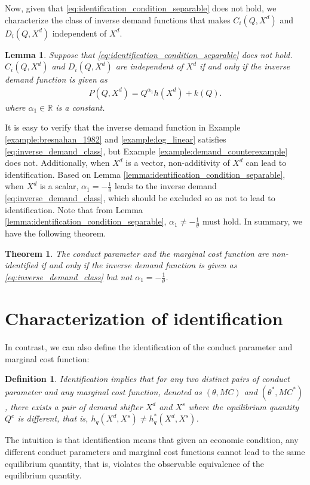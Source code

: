 \documentclass[11pt, a4paper]{article}
\newtheorem{theorem}{Theorem}
\newtheorem{lemma}{Lemma}
\newtheorem{definition}{Definition}
\theoremstyle{remark}
\begin{document}
Now, given that \eqref{eq:identification_condition_separable} does not hold, we characterize the class of inverse demand functions that makes $C_i(Q, X^{d})$ and $D_i(Q, X^{d})$ independent of $X^{d}$.
\begin{lemma}\label{lemma:non-identification_inverse_demand}
    Suppose that \eqref{eq:identification_condition_separable} does not hold.
    $C_i(Q, X^{d})$ and $D_i(Q, X^{d})$ are independent of $X^{d}$ if and only if the inverse demand function is given as
    \begin{align}
        P(Q, X^{d}) = Q^{\alpha_1}h(X^{d}) + k(Q). \label{eq:inverse_demand_class}
    \end{align}
    where $\alpha_1 \in \mathbb{R}$ is a constant.
\end{lemma}
It is easy to verify that the inverse demand function in Example \ref{example:bresnahan_1982} and \ref{example:log_linear} satisfies \eqref{eq:inverse_demand_class}, but Example \ref{example:demand_counterexample} does not.
Additionally, when $X^{d}$ is a vector, non-additivity of $X^{d}$ can lead to identification.
Based on Lemma \ref{lemma:identification_condition_separable}, when $X^{d}$ is a scalar, $\alpha_1 = -\frac{1}{\theta}$ leads to the inverse demand \eqref{eq:inverse_demand_class}, which should be excluded so as not to lead to identification.
Note that from Lemma \ref{lemma:identification_condition_separable}, $\alpha_1 \ne -\frac{1}{\theta}$ must hold.
In summary, we have the following theorem.
\begin{theorem}\label{theorem:identification_characterization}
    The conduct parameter and the marginal cost function are non-identified if and only if the inverse demand function is given as \eqref{eq:inverse_demand_class} but not $\alpha_1 = -\frac{1}{\theta}$.
\end{theorem}







\section{Characterization of identification}\label{sec:identification_characterization}


In contrast, we can also define the identification of the conduct parameter and marginal cost function:
\begin{definition}\label{def:identification}
    Identification implies that for any two distinct pairs of conduct parameter and any marginal cost function, denoted as $(\theta, MC)$ and $(\theta^{*}, MC^{*})$, there exists a pair of demand shifter $X^{d}$ and $X^{s}$ where the equilibrium quantity $Q^e$ is different, that is, $h_q(X^{d}, X^{s}) \ne h_q^{*}(X^{d}, X^{s})$.
\end{definition}
The intuition is that identification means that given an economic condition, any different conduct parameters and marginal cost functions cannot lead to the same equilibrium quantity, that is, violates the observable equivalence of the equilibrium quantity.
\end{document}
